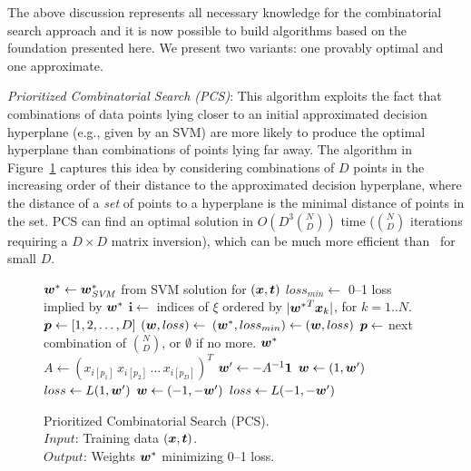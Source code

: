 The above discussion represents all necessary knowledge for the
combinatorial search approach and it is now possible to build
algorithms based on the foundation presented here.  We present
two variants: one provably optimal and one approximate.

\noindent\emph{Prioritized Combinatorial Search (PCS)}: This algorithm
exploits the fact that combinations of data points lying closer to an
initial approximated decision hyperplane (e.g., given by an SVM) are
more likely to produce the optimal hyperplane than combinations of
points lying far away.  The algorithm in
Figure~\ref{alg:cs.prioritized} captures this idea by considering
combinations of $D$ points in the increasing order of their distance
to the approximated decision hyperplane, where the distance of a \emph{set}
of points to a hyperplane is the minimal distance of points in the set.  PCS
can find an optimal solution in $O(D^3 \binom{N}{D})$ 
time ($\binom{N}{D}$ iterations requiring a $D \times D$ matrix inversion),
which can be much more efficient than \BB\ for small $D$.

\begin{figure}[tp!]
\vspace{-3mm}
\caption{
Prioritized Combinatorial Search (PCS).\hfill\; \\
\text{\hspace{1.4cm}} $Input$: Training data $(\boldsymbol{x},\boldsymbol{t})$. \\
\text{\hspace{1.4cm}} $Output$: Weights $\boldsymbol{w}^*$ minimizing 0--1 loss.
}
\label{alg:cs.prioritized}
{\footnotesize 
\begin{algorithmic}[1]
 
\State $\boldsymbol{w}^* \gets \boldsymbol{w}^*_{\mathit{SVM}}$ from SVM solution for $(\boldsymbol{x},\boldsymbol{t})$
\State $loss_{min} \gets$ 0--1 loss implied by $\boldsymbol{w}^*$
\State $\boldsymbol{i} \gets$ indices of $\xi$ ordered by $|{\boldsymbol{w}^*}^T\boldsymbol{x}_k|$, for $k=1..N$.
\State $\boldsymbol{p} \gets [1,2,\dots,D]$
\While{$\p \not= \emptyset$}
   \State $(\boldsymbol{w},loss) \gets$ 
      \State $(\boldsymbol{w}^*, loss_{min}) \gets (\boldsymbol{w}, loss)$
   \EndIf
   \State $\boldsymbol{p} \gets $ next combination of ${N \choose D}$, or $\emptyset$ if no more.
\EndWhile
\State \Return $\boldsymbol{w}^*$
\Statex
{} 
   \State $A \gets (x_{i[p_1]} \, x_{i[p_2]} \, \dots \, x_{i[p_D]})^T$
   \State $\boldsymbol{w}' \gets -A^{-1} \boldsymbol{1}$
      \State $\boldsymbol{w} \gets (1, \boldsymbol{w}')$
      \State $loss \gets L(1,\boldsymbol{w}')$
   \Else
      \State $\boldsymbol{w} \gets (-1, -\boldsymbol{w}')$
      \State $loss \gets L(-1,-\boldsymbol{w}')$
   \EndIf
   \State {} 
\EndFunction
\Statex
\EndFunction
\end{algorithmic}}
\vspace{-4mm}
\end{figure}

